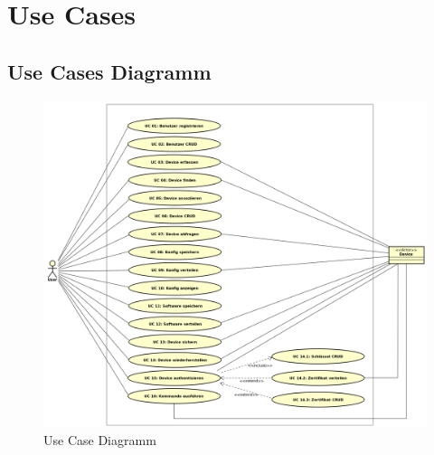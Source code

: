 \section{Use Cases}
\subsection{Use Cases Diagramm}
\begin{figure}[H]
\centering
\includegraphics[scale=0.39]{images/use_case_diagram.png}\caption{Use Case Diagramm}
\end{figure}
\newpage
